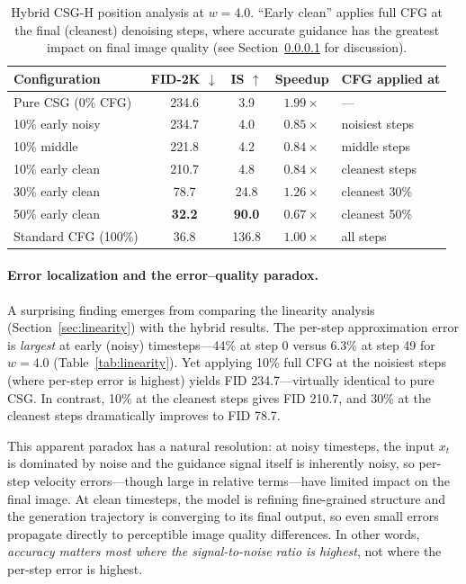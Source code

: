 \documentclass{article}
\begin{document}
\begin{table}[t]
\caption{Hybrid CSG-H position analysis at $w = 4.0$. ``Early clean'' applies full CFG at the final (cleanest) denoising steps, where accurate guidance has the greatest impact on final image quality (see Section~\ref{sec:error_vs_quality} for discussion).}
\label{tab:hybrid}
\centering\small
\begin{tabular}{lcccl}
\toprule
Configuration & FID-2K $\downarrow$ & IS $\uparrow$ & Speedup & CFG applied at \\
\midrule
Pure CSG (0\% CFG) & 234.6 & 3.9 & $1.99\times$ & --- \\
10\% early noisy & 234.7 & 4.0 & $0.85\times$ & noisiest steps \\
10\% middle & 221.8 & 4.2 & $0.84\times$ & middle steps \\
10\% early clean & 210.7 & 4.8 & $0.84\times$ & cleanest steps \\
30\% early clean & 78.7 & 24.8 & $1.26\times$ & cleanest 30\% \\
50\% early clean & \textbf{32.2} & \textbf{90.0} & $0.67\times$ & cleanest 50\% \\
\midrule
Standard CFG (100\%) & 36.8 & 136.8 & $1.00\times$ & all steps \\
\bottomrule
\end{tabular}
\end{table}

\paragraph{Error localization and the error--quality paradox.}
\label{sec:error_vs_quality}
A surprising finding emerges from comparing the linearity analysis (Section~\ref{sec:linearity}) with the hybrid results. The per-step approximation error is \textit{largest} at early (noisy) timesteps---44\% at step 0 versus 6.3\% at step 49 for $w = 4.0$ (Table~\ref{tab:linearity}). Yet applying 10\% full CFG at the noisiest steps (where per-step error is highest) yields FID 234.7---virtually identical to pure CSG. In contrast, 10\% at the cleanest steps gives FID 210.7, and 30\% at the cleanest steps dramatically improves to FID 78.7.

This apparent paradox has a natural resolution: at noisy timesteps, the input $x_t$ is dominated by noise and the guidance signal itself is inherently noisy, so per-step velocity errors---though large in relative terms---have limited impact on the final image. At clean timesteps, the model is refining fine-grained structure and the generation trajectory is converging to its final output, so even small errors propagate directly to perceptible image quality differences. In other words, \textit{accuracy matters most where the signal-to-noise ratio is highest}, not where the per-step error is highest.
\end{document}
